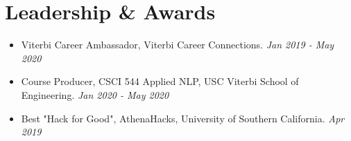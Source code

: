 \documentclass[letterpaper,10pt]{article}
\newcommand{\activity}[2]{
    \item #1 \emph{#2}
}
\newcommand{\bulletsBegin}{
    \vspace{1pt}
    \begin{minipage}{17.6cm}
    \begin{itemize}[leftmargin=0.6cm]
    \setlength\itemsep{-0.1em}
}
\newcommand{\bulletsEnd}{
    \end{itemize}\vspace{0pt}
    \end{minipage}
}
\begin{document}
    
    \section{Leadership \& Awards}

    \bulletsBegin
        \activity{Viterbi Career Ambassador, Viterbi Career Connections.}{Jan 2019 - May 2020}
        \vspace{-3pt}
        \activity{Course Producer, CSCI 544 Applied NLP, USC Viterbi School of Engineering.}{Jan 2020 - May 2020}
        \vspace{-3pt}
        \activity{Best "Hack for Good", AthenaHacks, University of Southern California.}{Apr 2019}
        \vspace{-2pt}
    \bulletsEnd

\end{document}
